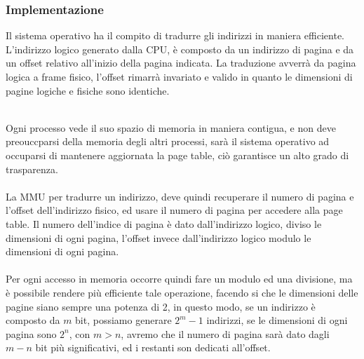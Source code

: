 \documentclass[12pt, letterpaper]{article}
\newcommand{\acc}{\\\hphantom{}\\}
\begin{document}
\subsubsection{Implementazione}
Il sistema operativo ha il compito di tradurre gli indirizzi in maniera efficiente. L'indirizzo logico generato 
dalla CPU, è composto da un indirizzo di pagina e da un offset relativo all'inizio della pagina indicata. La traduzione 
avverrà da pagina logica a frame fisico, l'offset rimarrà invariato e valido in quanto le dimensioni di pagine logiche 
e fisiche sono identiche. 
\begin{figure}[h]
\end{figure}\\
Ogni processo vede il suo spazio di memoria in maniera contigua, e non deve preouccparsi della memoria degli altri processi,
sarà il sistema operativo ad occuparsi di mantenere aggiornata la page table, ciò garantisce un alto 
grado di trasparenza.\acc 
La MMU per tradurre un indirizzo, deve quindi recuperare il numero di pagina e l'offset dell'indirizzo fisico, ed
usare il numero di pagina per accedere alla page table. Il numero dell'indice 
di pagina è dato dall'indirizzo logico, diviso le dimensioni di ogni pagina, l'offset invece 
dall'indirizzo logico modulo le dimensioni di ogni pagina. \acc Per ogni accesso in memoria occorre 
quindi fare un modulo ed una divisione, ma è possibile rendere più efficiente tale operazione, facendo si che 
le dimensioni delle pagine siano sempre una potenza di 2, in questo modo, se un indirizzo è composto da \(m\) bit,
possiamo generare \(2^m-1\) indirizzi, se le dimensioni di ogni pagina sono \(2^n\), con \(m>n\), avremo che il numero di 
pagina sarà dato dagli \(m-n\) bit più significativi, ed i restanti son dedicati all'offset.\begin{figure}[h]
\end{figure}\\
\end{document}
